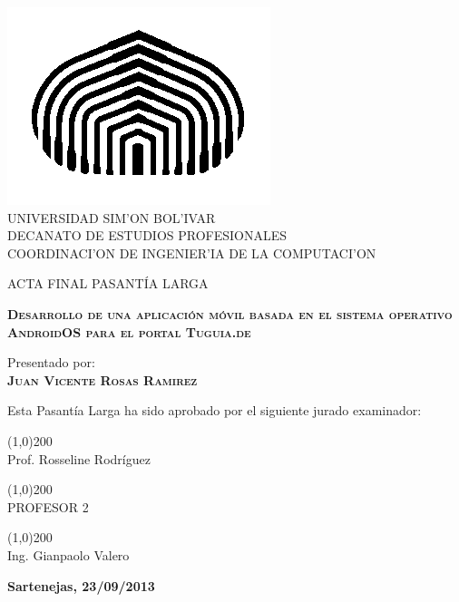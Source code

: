 \begin{titlepage}
\begin{center}

\includegraphics[scale=0.5,type=png,ext=.png,read=.png]{imagenes/cebolla} \\

\textsc {\large UNIVERSIDAD SIM'ON BOL'IVAR} \\
\textsc{DECANATO DE ESTUDIOS PROFESIONALES\\
COORDINACI'ON DE INGENIER'IA DE LA COMPUTACI'ON}

\bigskip
\bigskip
\bigskip
\bigskip
\bigskip
\bigskip

\textsc{ACTA FINAL PASANT\'IA LARGA}

\bigskip
\bigskip

\textsc{\bfseries Desarrollo de una aplicación móvil basada en el sistema operativo AndroidOS para el portal Tuguia.de}

\bigskip
\bigskip
\bigskip
\bigskip

\begin{minipage}{\textwidth}
\centering
Presentado por: \\
\textsc{\bfseries Juan Vicente Rosas Ramirez} \\

\bigskip
\bigskip
\bigskip
\bigskip

Esta Pasant\'ia Larga ha sido aprobado por el siguiente jurado examinador: \\

\bigskip
\bigskip

\line(1,0){200} \\
Prof. Rosseline Rodríguez\\

\bigskip
\bigskip

\line(1,0){200} \\
PROFESOR 2 \\

\bigskip
\bigskip

\line(1,0){200} \\
Ing. Gianpaolo Valero \\
\end{minipage}

\bigskip
\bigskip
\vfill

{\large \bfseries Sartenejas, 23/09/2013 }

\end{center}
\end{titlepage}
